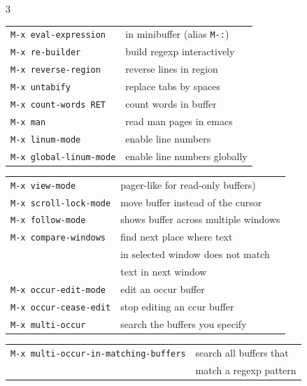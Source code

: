 \documentclass[11pt,landscape,a4paper]{article}
\begin{document}
\begin{multicols}{3}
\begin{tabular}{@{}ll@{}}
{\verb|M-x eval-expression|} & in minibuffer (alias \verb|M-:|)\\
{\verb|M-x re-builder|} & build regexp interactively\\ %
{\verb|M-x reverse-region|} & reverse lines in region\\
{\verb|M-x untabify|} & replace tabs by spaces\\
{\verb|M-x count-words RET|} & count words in buffer\\
{\verb|M-x man|} & read man pages in emacs\\
{\verb|M-x linum-mode|}  & enable line numbers\\ %
{\verb|M-x global-linum-mode|} & enable line numbers globally \\ %
\end{tabular}

\begin{tabular}{@{}ll@{}}
{\verb|M-x view-mode|} & pager-like for read-only buffers)\\ %
{\verb|M-x scroll-lock-mode|} & move buffer instead of the cursor\\ %
{\verb|M-x follow-mode|} & shows buffer across multiple windows\\ %
\verb|M-x compare-windows|  & find next place where text\\ 
& in selected window does not match\\
&text in next window\\
{\verb|M-x occur-edit-mode|} & edit an occur buffer\\ %
{\verb|M-x occur-cease-edit|} & stop editing an ccur buffer\\ %
{\verb|M-x multi-occur|} & search the buffers you specify\\
\end{tabular}

\begin{tabular}{@{}ll@{}}
{\verb|M-x multi-occur-in-matching-buffers|}	& search all buffers that \\
												& match a regexp pattern\\ %
\end{tabular}

%





\end{multicols}
\end{document}

